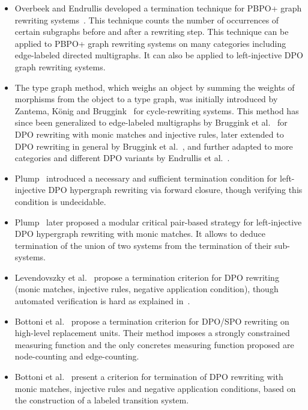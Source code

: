 \begin{itemize}
    \item Overbeek and Endrullis developed a termination technique for PBPO+ graph rewriting systems~\cite{overbeek2024termination_lmcs}. This technique counts the number of occurrences of certain subgraphs before and after a rewriting step. This technique can be applied to PBPO+ graph rewriting systems on many categories including edge-labeled directed multigraphs. It can also be applied to left-injective DPO graph rewriting systems.
    \item The type graph method, which weighs an object by summing the weights of morphisms from the object to a type graph, was initially introduced by Zantema, K{\"o}nig and Bruggink~\cite{zantema2014termination} for cycle-rewriting systems. 
    This method has since been generalized to edge-labeled multigraphs by Bruggink et al.~\cite{bruggink2014termination} for DPO rewriting with monic matches and injective rules, later extended to DPO rewriting in general by Bruggink et al.~\cite{bruggink2015proving}, and further adapted to more categories and different DPO variants by Endrullis et al.~\cite{endrullis2024generalized_arxiv_v2}. 
    \item Plump~\cite{plump1995ontermination} introduced a necessary and sufficient termination condition for left-injective DPO hypergraph rewriting via forward closure, though verifying this condition is undecidable. 
    \item Plump~\cite{plump2018modular} later proposed a modular critical pair-based strategy for left-injective DPO hypergraph rewriting with monic matches. It allows to deduce termination of the union of two systems from the termination of their sub-systems.
    \item Levendovszky et al.~\cite{levendovszky2007termination} propose a termination criterion for DPO rewriting (monic matches, injective rules, negative application condition), though automated verification is hard as explained in~\cite[]{levendovszky2007termination}. 
    \item Bottoni et al.~\cite{bottoni2005termination} propose a termination criterion for DPO/SPO rewriting on high-level replacement units. Their method imposes a strongly constrained measuring function and the only concretes measuring function proposed are node-counting and edge-counting.
    \item Bottoni et al.~\cite{bottoni2010atermination} present a criterion for termination of DPO rewriting with monic matches, injective rules and negative application conditions, based on the construction of a labeled transition system. 
\end{itemize}

